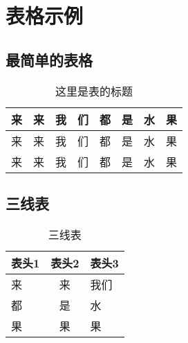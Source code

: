 \section{表格示例}
\subsection{最简单的表格}
\begin{table}[htbp]
\begin{center}
\caption{这里是表的标题} \label{tab:simpletable}
\begin{tabular}{|c|c|c|c|c|c|c|c|}
    \hline
    来 & 来 & 我 & 们 & 都 & 是 & 水 & 果 \\
    \hline
    来 & 来 & 我 & 们 & 都 & 是 & 水 & 果\\
    \hline
    来 & 来 & 我 & 们 & 都 & 是 & 水 & 果\\
    \hline
\end{tabular}
\end{center}
\end{table}

\subsection{三线表}

\begin{table}[htbp]
  \centering
 \caption{三线表}  \label{tab:test}
 \begin{tabular}{lcl}
  \toprule
  表头1 & 表头2 & 表头3\\
  \midrule
 来 & 来 & 我们 \\
 都 & 是 & 水 \\
 果 & 果 & 果\\
  \bottomrule
 \end{tabular}
\end{table}
